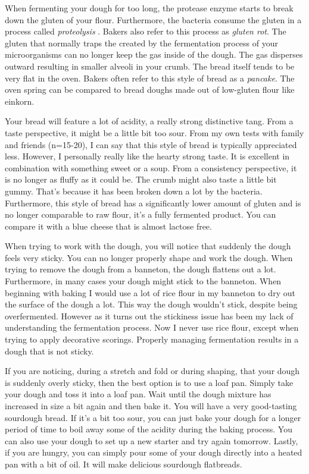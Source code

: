 When fermenting your dough for too long, the protease enzyme starts to
break down the gluten of your flour. Furthermore, the bacteria consume the gluten
in a process called {\it proteolysis} \cite{raffaella+di+cagno}.
Bakers also refer to this process as {\it gluten rot}.
The gluten that normally traps the  created
by the fermentation process of your microorganisms can no longer keep the
gas inside of the dough. The gas disperses outward resulting in smaller alveoli in your crumb.
The bread itself tends to be very flat in the oven. Bakers often refer
to this style of bread as a {\it pancake}. The oven spring can be compared
to bread doughs made out of low-gluten flour like einkorn.

Your bread will feature a lot of acidity, a really strong distinctive tang. From
a taste perspective, it might be a little bit too sour. From my own tests with family and
friends (n=15-20), I can say that this style of bread is typically
appreciated less. However, I personally really like the hearty strong taste.
It is excellent in combination with something
sweet or a soup.  From a consistency perspective, it is no longer as fluffy as it could be.
The crumb might also taste a little bit gummy. That's because it has been broken down a lot
by the bacteria. Furthermore, this style of bread has a significantly lower amount of gluten \cite{raffaella+di+cagno}
and is no longer comparable to raw flour, it's a fully fermented product.
You can compare it with a blue cheese that is almost lactose free.

When trying to work with the dough, you will notice that suddenly the dough feels
very sticky. You can no longer properly shape and work the dough. When trying to
remove the dough from a banneton, the dough flattens out a lot. Furthermore,
in many cases your dough might stick to the banneton. When beginning with baking
I would use a lot of rice flour in my banneton to dry out the surface of the dough a lot.
This way the dough wouldn't stick, despite being overfermented. However as it
turns out the stickiness issue has been my lack of understanding the fermentation
process. Now I never use rice flour, except when trying to apply decorative scorings.
Properly managing fermentation results in a dough that is not sticky.

If you are noticing, during a stretch and fold or during shaping, that your dough
is suddenly overly sticky, then the best option is to use a loaf pan. Simply take
your dough and toss it into a loaf pan. Wait until the dough mixture has increased
in size a bit again and then bake it. You will have a very good-tasting sourdough
bread. If it's a bit too sour, you can just bake your dough for a longer period
of time to boil away some of the acidity during the baking process. You can also use
your dough to set up a new starter and try again tomorrow. Lastly, if you are hungry,
you can simply pour some of your dough directly into a heated pan with a bit of
oil. It will make delicious sourdough flatbreads.

